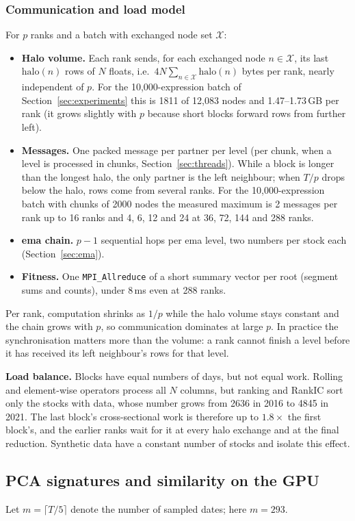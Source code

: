 \documentclass[11pt,a4paper]{article}
\newcommand{\code}[1]{\texttt{#1}}
\begin{document}
\subsubsection{Communication and load model}
For $p$ ranks and a batch with exchanged node set $\mathcal{X}$:
\begin{itemize}[nosep]
  \item \textbf{Halo volume.} Each rank sends, for each exchanged node $n\in\mathcal{X}$, its last $\mathrm{halo}(n)$ rows of $N$ floats, i.e.\ $4N\sum_{n\in\mathcal{X}}\mathrm{halo}(n)$ bytes per rank, nearly independent of $p$. For the 10{,}000-expression batch of Section~\ref{sec:experiments} this is 1811 of 12{,}083 nodes and 1.47--1.73\,GB per rank (it grows slightly with $p$ because short blocks forward rows from further left).
  \item \textbf{Messages.} One packed message per partner per level (per chunk, when a level is processed in chunks, Section~\ref{sec:threads}). While a block is longer than the longest halo, the only partner is the left neighbour; when $T/p$ drops below the halo, rows come from several ranks. For the 10{,}000-expression batch with chunks of 2000 nodes the measured maximum is 2 messages per rank up to 16 ranks and 4, 6, 12 and 24 at 36, 72, 144 and 288 ranks.
  \item \textbf{ema chain.} $p-1$ sequential hops per ema level, two numbers per stock each (Section~\ref{sec:ema}).
  \item \textbf{Fitness.} One \code{MPI\_Allreduce} of a short summary vector per root (segment sums and counts), under 8\,ms even at 288 ranks.
\end{itemize}
Per rank, computation shrinks as $1/p$ while the halo volume stays constant and the chain grows with $p$, so communication dominates at large $p$. In practice the synchronisation matters more than the volume: a rank cannot finish a level before it has received its left neighbour's rows for that level.

\textbf{Load balance.} Blocks have equal numbers of days, but not equal work. Rolling and element-wise operators process all $N$ columns, but ranking and RankIC sort only the stocks with data, whose number grows from 2636 in 2016 to 4845 in 2021. The last block's cross-sectional work is therefore up to $1.8\times$ the first block's, and the earlier ranks wait for it at every halo exchange and at the final reduction. Synthetic data have a constant number of stocks and isolate this effect.

\subsection{PCA signatures and similarity on the GPU}
\label{sec:pca}
\providecommand{\PCAFigureDir}{figures/pca}
Let $m=\lceil T/5\rceil$ denote the number of sampled dates; here $m=293$.
\end{document}
